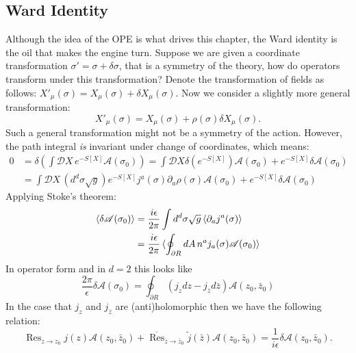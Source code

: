 \documentclass{report}
\theoremstyle{plain}
\theoremstyle{definition}
\theoremstyle{remark}
\newcommand{\FR}[2]{\frac{#1}{#2}}
\newcommand{\mc}{\mathcal}
\newcommand{\ms}{\mathscr}
\newcommand{\sg}{\sigma}
\newcommand{\di}{\partial}
\DeclareMathOperator{\Res}{Res}
\begin{document}
\subsection{Ward Identity}
Although the idea of the OPE is what drives this chapter, the Ward identity
is the oil that makes the engine turn. Suppose we are given a coordinate
transformation $\sg' = \sg+\delta\sg$, that is a symmetry of the theory,
how do operators transform under this transformation? Denote the
transformation of fields as follows: $X'_\mu(\sg) = X_\mu(\sg) + \delta
X_\mu(\sg)$. Now we consider a slightly more general transformation: 
\[ X'_\mu(\sg) = X_\mu(\sg)+\rho(\sg)\delta X_\mu(\sg).\] 
Such a general transformation might not be a symmetry of the action.
However, the path integral \emph{is} invariant under change of coordinates,
which means:
\begin{align*}
0 &= \delta\left( \int \mc DX\, e^{-S[X]}\ms A(\sg_0) \right)
=\int\mc DX\delta (e^{-S[X]})\ms A(\sg_0)+e^{-S[X]}\delta\ms A(\sg_0)\\
&=\int\mc DX\,(d^d\sg\sqrt{g}) e^{-S[X]} j^a(\sg)\di_a\rho(\sg)\ms
A(\sg_0)+e^{-S[X]}\delta\ms A(\sg_0)
\end{align*}
Applying Stoke's theorem:
\begin{align*}
\braket{\delta \ms A(\sg_0)} &= \FR{i\epsilon}{2\pi} \int d^d\sg
\sqrt{g} \braket{\di_aj^a(\sg)}\\
&= \FR{i\epsilon}{2\pi} \braket{ \oint_{\di R} dA\,n^aj_a(\sg)\ms A(\sg_0)}
\end{align*}
In operator form and in $d=2$ this looks like
\[\FR{2\pi}{\epsilon}\delta \ms A(\sg_0)
=\oint_{\di R} (j_zdz - j_{\bar z}d\bar z) \ms A(z_0,\bar z_0)\]
In the case that $j_z$ and $j_{\bar z}$ are (anti)holomorphic then we have
the following relation:
\[\Res_{z\to z_0} j(z)\ms A(z_0,\bar z_0) + \overline{\Res}_{\bar z\to\bar
z_0} \tilde j(\bar z)\ms A(z_0,\bar z_0) = \FR{1}{i\epsilon}\delta\ms
A(z_0,\bar z_0).\]
\end{document}
